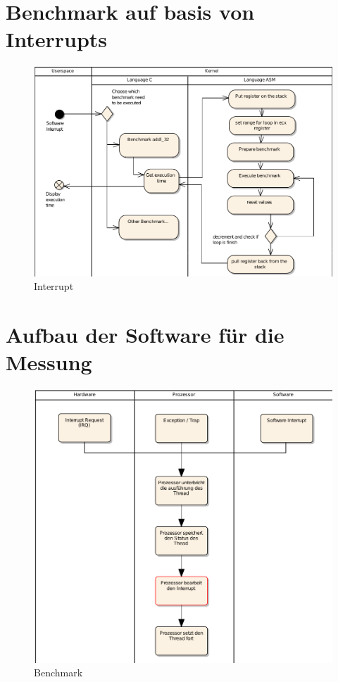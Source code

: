 
\section{Benchmark auf basis von Interrupts}
\label{chap:benchmark_basis_interrupts}


\begin{figure}[h]
\centering
\includegraphics[scale=1]{images/interrupt_ea.pdf}
\caption{Interrupt}
\label{fig:Interrupt}
\end{figure}

\section{Aufbau der Software für die Messung}


\begin{figure}[h]
\centering
\includegraphics[scale=1]{images/benchmark_ea.pdf}
\caption{Benchmark}
\label{fig:Benchmark}
\end{figure}

